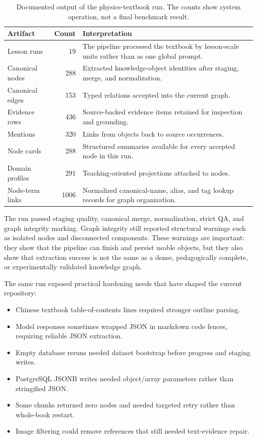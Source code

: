 \documentclass[11pt,letterpaper]{article}
\begin{document}
\begin{table}[H]
\centering
\small
\begin{tabularx}{0.88\textwidth}{@{}l r Y@{}}
\toprule
\textbf{Artifact} & \textbf{Count} & \textbf{Interpretation}\\
\midrule
Lesson runs & 19 & The pipeline processed the textbook by lesson-scale units rather than as one global prompt.\\
Canonical nodes & 288 & Extracted knowledge-object identities after staging, merge, and normalization.\\
Canonical edges & 153 & Typed relations accepted into the current graph.\\
Evidence rows & 436 & Source-backed evidence items retained for inspection and grounding.\\
Mentions & 320 & Links from objects back to source occurrences.\\
Node cards & 288 & Structured summaries available for every accepted node in this run.\\
Domain profiles & 291 & Teaching-oriented projections attached to nodes.\\
Node-term links & 1006 & Normalized canonical-name, alias, and tag lookup records for graph organization.\\
\bottomrule
\end{tabularx}
\caption{Documented output of the physics-textbook run. The counts show system operation, not a final benchmark result.}
\label{tab:physics-run}
\end{table}

The run passed staging quality, canonical merge, normalization, strict QA, and graph integrity marking. Graph integrity still reported structural warnings such as isolated nodes and disconnected components. These warnings are important: they show that the pipeline can finish and persist usable objects, but they also show that extraction success is not the same as a dense, pedagogically complete, or experimentally validated knowledge graph.

The same run exposed practical hardening needs that have shaped the current repository:

\begin{itemize}
  \item Chinese textbook table-of-contents lines required stronger outline parsing.
  \item Model responses sometimes wrapped JSON in markdown code fences, requiring reliable JSON extraction.
  \item Empty database reruns needed dataset bootstrap before progress and staging writes.
  \item PostgreSQL JSONB writes needed object/array parameters rather than stringified JSON.
  \item Some chunks returned zero nodes and needed targeted retry rather than whole-book restart.
  \item Image filtering could remove references that still needed text-evidence repair.
\end{itemize}
\end{document}
